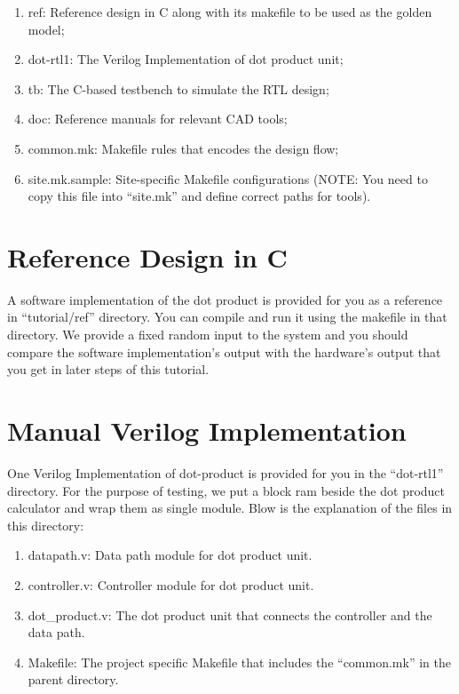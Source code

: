 \documentclass[12pt]{article}
\begin{document}
\begin{enumerate}

\item ref: Reference design in C along with its makefile to be used
    as the golden model;

\item dot-rtl1: The Verilog Implementation of dot product unit;

\item tb: The C-based testbench to simulate the RTL design;

\item doc: Reference manuals for relevant CAD tools;

\item common.mk: Makefile rules that encodes the design flow;

\item site.mk.sample: Site-specific Makefile configurations (NOTE: You
  need to copy this file into “site.mk” and define correct paths for
  tools).

\end{enumerate}

\section{Reference Design in C}

A software implementation of the dot product is provided for you as a
reference in “tutorial/ref” directory. You can compile and run it
using the makefile in that directory. We provide a fixed random input
to the system and you should compare the software implementation’s
output with the hardware’s output that you get in later steps of this
tutorial.

\section{Manual Verilog Implementation}

One Verilog Implementation of dot-product is provided for you in the
“dot-rtl1” directory. For the purpose of testing, we put a block ram
beside the dot product calculator and wrap them as single module. Blow
is the explanation of the files in this directory:

\begin{enumerate}
  
\item datapath.v: Data path module for dot product unit.
  
\item controller.v: Controller module for dot product unit.
  
\item dot\_product.v: The dot product unit that connects the controller
  and the data path.
  
\item Makefile: The project specific Makefile that includes the
  “common.mk” in the parent directory.

\end{enumerate}
\end{document}

